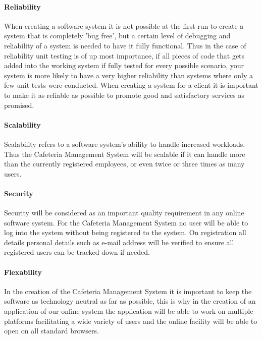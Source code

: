 \documentclass[12pt]{article}
\begin{document}
\paragraph{ Reliability\\}
When creating a software system it is not possible at the first run to create a system that is completely 'bug free', but a certain level of debugging and reliability of a system is needed to have it fully functional. Thus in the case of reliability unit testing is of up most importance, if all pieces of code that gets added into the working system if fully tested for every possible scenario, your system is more likely to have a very higher reliability than systems where only a few unit tests were conducted. When creating a system for a client it is important to make it as reliable as possible to promote good and satisfactory services as promised.

\paragraph{Scalability\\}
Scalability refers to a software system's ability to handle increased workloads. Thus the Cafeteria Management System will be scalable if it can handle more than the currently registered employees, or even twice or three times  as many users.  

\paragraph{Security\\}
Security will  be considered as an important quality requirement in any online software system. For the Cafeteria Management System no user will be able to log into the system without being registered to the system. On registration all details personal details such as e-mail address will be verified to ensure all registered users can be tracked down if needed.

\paragraph{Flexability\\}
In the creation of the Cafeteria Management System it is important to keep the software as technology neutral as far as possible, this is why in the creation of an application of our online system the application will be able to work on multiple platforms facilitating a wide variety of users and the online facility will be able to open on all standard browsers. 
\end{document}
